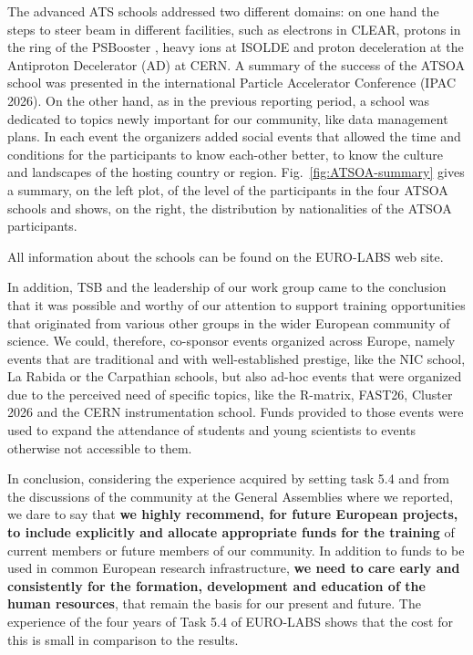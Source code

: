  The advanced ATS schools addressed two different domains: on one hand the steps to steer beam in different facilities, such as electrons in CLEAR, protons in the ring of the PSBooster , heavy ions at ISOLDE and proton deceleration at the Antiproton Decelerator (AD) at CERN. A summary of the success of the ATSOA school was presented in the international Particle Accelerator Conference (IPAC 2026).  On the other hand, as in the previous reporting period, a school was dedicated to topics newly important for our community, like data management plans. In each event the organizers added social events that allowed the time and conditions for the participants to know each-other better, to know the culture and landscapes of the hosting country or region.  Fig.~\ref{fig:ATSOA-summary} gives a summary, on the left plot, of the level of the participants in the four ATSOA schools and shows, on the right, the distribution by nationalities of the ATSOA participants. 




All information about the  schools can be found on the EURO-LABS web site. 

In addition, TSB and the leadership of our work group came to the conclusion that it was possible and worthy of our attention to support training opportunities that originated from various other groups in the wider European community of science. We could, therefore, co-sponsor events organized across Europe, namely events that are traditional and with well-established prestige, like the NIC school, La Rabida or the Carpathian schools, but also ad-hoc events that were organized due to the perceived need of specific topics, like the R-matrix, FAST26, Cluster 2026 and the CERN instrumentation school. Funds provided to those events were used to expand the attendance of students and young scientists to events otherwise not accessible to them. 


In conclusion, considering the experience acquired by setting task 5.4 and from the discussions of the community at the General Assemblies where we reported, we dare to say that {\bf we highly recommend, for future European projects, to include explicitly and allocate appropriate funds for the training} of current members or future members of our community. In addition to funds to be used 
in common European research infrastructure, {\bf we need to care early and consistently for the formation, development and education of the human resources}, that remain the basis for our present and future. The experience of the four years of Task 5.4 of EURO-LABS shows that the cost for this is small in comparison to the results.

